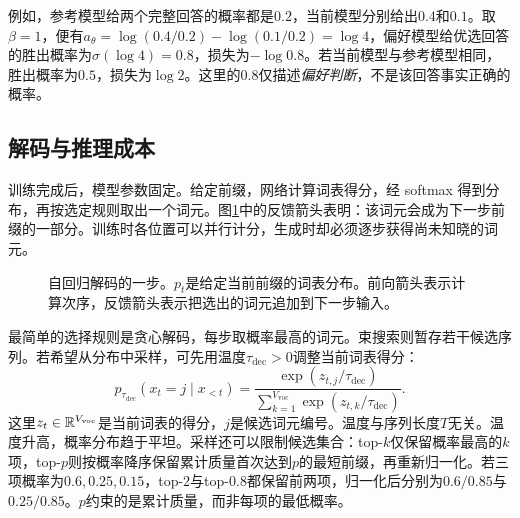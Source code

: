 例如，参考模型给两个完整回答的概率都是$0.2$，当前模型分别给出$0.4$和$0.1$。取$\beta=1$，便有$a_\theta=\log(0.4/0.2)-\log(0.1/0.2)=\log4$，偏好模型给优选回答的胜出概率为$\sigma(\log4)=0.8$，损失为$-\log0.8$。若当前模型与参考模型相同，胜出概率为$0.5$，损失为$\log2$。这里的$0.8$仅描述\emph{偏好判断}，不是该回答事实正确的概率。

\subsection{解码与推理成本}
训练完成后，模型参数固定。给定前缀，网络计算词表得分，经 softmax 得到分布，再按选定规则取出一个词元。图\ref{fig:llm-decoding-loop}中的反馈箭头表明：该词元会成为下一步前缀的一部分。训练时各位置可以并行计分，生成时却必须逐步获得尚未知晓的词元。
\begin{figure}[H]
\centering
{}
\caption{自回归解码的一步。$p_t$是给定当前前缀的词表分布。前向箭头表示计算次序，反馈箭头表示把选出的词元追加到下一步输入。}
\label{fig:llm-decoding-loop}
\end{figure}

最简单的选择规则是贪心解码，每步取概率最高的词元。束搜索则暂存若干候选序列。若希望从分布中采样，可先用温度$\tau_{\mathrm{dec}}>0$调整当前词表得分：
\begin{equation}
 p_{\tau_{\mathrm{dec}}}(x_t=j\mid x_{<t})
 =\frac{\exp(z_{t,j}/\tau_{\mathrm{dec}})}{\sum_{k=1}^{V_{\mathrm{voc}}}\exp(z_{t,k}/\tau_{\mathrm{dec}})}.
\end{equation}
这里$z_t\in\mathbb{R}^{V_{\mathrm{voc}}}$是当前词表的得分，$j$是候选词元编号。温度与序列长度$T$无关。温度升高，概率分布趋于平坦。采样还可以限制候选集合：top-$k$仅保留概率最高的$k$项，top-$p$则按概率降序保留累计质量首次达到$p$的最短前缀，再重新归一化。若三项概率为$0.6,0.25,0.15$，top-$2$与top-$0.8$都保留前两项，归一化后分别为$0.6/0.85$与$0.25/0.85$。$p$约束的是累计质量，而非每项的最低概率。

